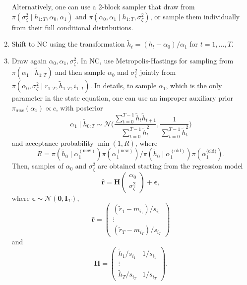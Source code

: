 \documentclass[
  12pt,
]{book}
\theoremstyle{break}
\theoremstyle{nonumberplain}
\begin{document}
\begin{enumerate}
Alternatively, one can use a 2-block sampler that draw from $\pi(\sigma^2_\zeta\mid h_{1:T},\alpha_0,\alpha_1)$ and  $\pi(\alpha_0,\alpha_1\mid h_{1:T},\sigma^2_\zeta)$, or sample them individually from their full conditional distributions. 
\item Shift to NC using the transformation $\tilde{h}_{t}=(h_{t}-\alpha_0)/\alpha_1$ for $t=1,...,T$.
\item Draw again $\alpha_0,\alpha_1,\sigma^2_\zeta$. In NC, use Metropolis-Hastings for sampling from $\pi(\alpha_1\mid\tilde{h}_{1:T})$ and then sample $\alpha_0$ and $\sigma^2_\zeta$ jointly from $\pi(\alpha_0,\sigma^2_\zeta\mid r_{1:T},\tilde{h}_{1:T},i_{1:T})$. In details, to sample $\alpha_1$, which is the only parameter in the state equation, one can use an improper auxiliary prior $\pi_{aux}(\alpha_1)\propto c$, with posterior
\[
\alpha_1\mid\tilde{h}_{0:T}\sim\mathcal{N}\bigg(\frac{\sum_{t=0}^{T-1}\tilde{h}_{t}\tilde{h}_{t+1}}{\sum_{t=0}^{T-1}\tilde{h}_{t}^{2}},\frac{1}{\sum_{t=0}^{T-1}\tilde{h}_{t}^{2}}\bigg)
\]
and acceptance probability $\min(1,R)$, where 
\[
R = \pi(\tilde{h}_{0}\mid\alpha_{1}^{(\text{new})})\pi(\alpha_1^{(\text{new})})/\pi(\tilde{h}_{0}\mid \alpha_1^{(\text{old})})\pi(\alpha_1^{\text{(old)}}).
\]
Then, samples of $\alpha_0$ and $\sigma^2_\zeta$ are obtained starting from the regression model
\[
\hat{\boldsymbol{r}}=\boldsymbol{H}\begin{pmatrix}\alpha_0 \\ \sigma^2_\zeta \end{pmatrix} + \boldsymbol{\epsilon}, 
\]
where $\boldsymbol{\epsilon}\sim \mathcal{N}(\boldsymbol{0},\boldsymbol{I}_{T})$, 
\[
\hat{\boldsymbol{r}} = \begin{pmatrix} 
(\tilde{r}_{1}-m_{i_1})/s_{i_1} \\ 
\vdots \\
(\tilde{r}_{T}-m_{i_T})/s_{i_T}
\end{pmatrix}
\]
and 
\[
\boldsymbol{H} = \begin{pmatrix} 
\tilde{h}_{1}/s_{i_1} &  1/s_{i_1} \\ 
\vdots \\
\tilde{h}_{T}/s_{i_T} &  1/s_{i_T}
\end{pmatrix}.
\]


\end{enumerate}
\end{document}
